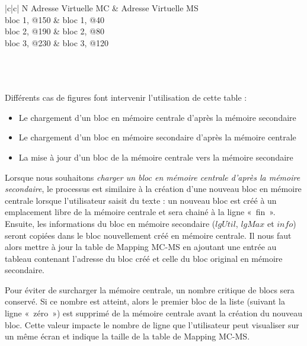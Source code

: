\newcommand{\TableMSMCSolTroisHLine}{\cline{1-4} \cline{6-6}}
\begin{table}[H]
	\centering
	\begin{tabular}{|c|c|}
		N\textdegree{} Adresse Virtuelle MC & Adresse Virtuelle MS \\
		\hline
		\hline
		bloc 1, @150 & bloc 1, @40 \\
		\hline
		bloc 2, @190 & bloc 2, @80 \\
		\hline
		bloc 3, @230 & bloc 3, @120 \\
		\hline
		 \\
		 \\
		 \\
		\hline
	\end{tabular}
	\caption{Structure de la table de \textsl{mapping MC-MS} de la solution 3}
\end{table}

Différents cas de figures font intervenir l'utilisation de cette table :
\begin{itemize}
	\item Le chargement d'un bloc en mémoire centrale d'après la mémoire secondaire
	\item Le chargement d'un bloc en mémoire secondaire d'après la mémoire centrale
	\item La mise à jour d'un bloc de la mémoire centrale vers la mémoire secondaire
\end{itemize}


Lorsque nous souhaitons \emph{charger un bloc en mémoire centrale d'après la mémoire 
secondaire}, le processus est similaire à la création d'une nouveau bloc en
mémoire centrale lorsque l'utilisateur saisit du texte : un nouveau bloc est 
créé à un emplacement libre de la mémoire centrale et sera chainé à la ligne
«~fin~». Ensuite, les informations du bloc en mémoire secondaire ($lgUtil$,
$lgMax$ et $info$) seront copiées dans le bloc nouvellement créé en mémoire
centrale. Il nous faut alors mettre à jour la table de Mapping MC-MS en ajoutant
une entrée au tableau contenant l'adresse du bloc créé et celle du bloc original
en mémoire secondaire.

Pour éviter de surcharger la mémoire centrale, un nombre critique de blocs sera
conservé. Si ce nombre est atteint, alors le premier bloc de la liste (suivant
la ligne «~zéro~») est supprimé de la mémoire centrale avant la création du
nouveau bloc. Cette valeur impacte le nombre de ligne que l'utilisateur peut
visualiser sur un même écran et indique la taille de la table de Mapping MC-MS.

